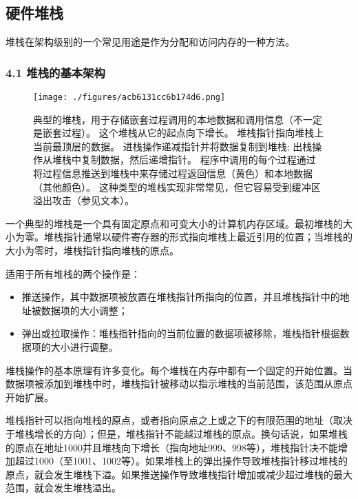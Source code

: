 \subsection{硬件堆栈}
堆栈在架构级别的一个常见用途是作为分配和访问内存的一种方法。
\subsubsection{4.1 堆栈的基本架构}
\begin{figure}[ht]
\centering
\texttt{[image: ./figures/acb6131cc6b174d6.png]}
\caption{典型的堆栈，用于存储嵌套过程调用的本地数据和调用信息（不一定是嵌套过程）。 这个堆栈从它的起点向下增长。 堆栈指针指向堆栈上当前最顶层的数据。 进栈操作递减指针并将数据复制到堆栈; 出栈操作从堆栈中复制数据，然后递增指针。 程序中调用的每个过程通过将过程信息推送到堆栈中来存储过程返回信息（黄色）和本地数据（其他颜色）。 这种类型的堆栈实现非常常见，但它容易受到缓冲区溢出攻击（参见文本）。} \label{fig_Zhan_1}
\end{figure}
一个典型的堆栈是一个具有固定原点和可变大小的计算机内存区域。最初堆栈的大小为零。堆栈指针通常以硬件寄存器的形式指向堆栈上最近引用的位置；当堆栈的大小为零时，堆栈指针指向堆栈的原点。

适用于所有堆栈的两个操作是：
\begin{itemize}
\item 推送操作，其中数据项被放置在堆栈指针所指向的位置，并且堆栈指针中的地址被数据项的大小调整；
\item 弹出或拉取操作：堆栈指针指向的当前位置的数据项被移除，堆栈指针根据数据项的大小进行调整。
\end{itemize}
堆栈操作的基本原理有许多变化。每个堆栈在内存中都有一个固定的开始位置。当数据项被添加到堆栈中时，堆栈指针被移动以指示堆栈的当前范围，该范围从原点开始扩展。

堆栈指针可以指向堆栈的原点，或者指向原点之上或之下的有限范围的地址（取决于堆栈增长的方向）；但是，堆栈指针不能越过堆栈的原点。换句话说，如果堆栈的原点在地址1000并且堆栈向下增长（指向地址999、998等），堆栈指针决不能增加超过1000（至1001、1002等）。如果堆栈上的弹出操作导致堆栈指针移过堆栈的原点，就会发生堆栈下溢。如果推送操作导致堆栈指针增加或减少超过堆栈的最大范围，就会发生堆栈溢出。

